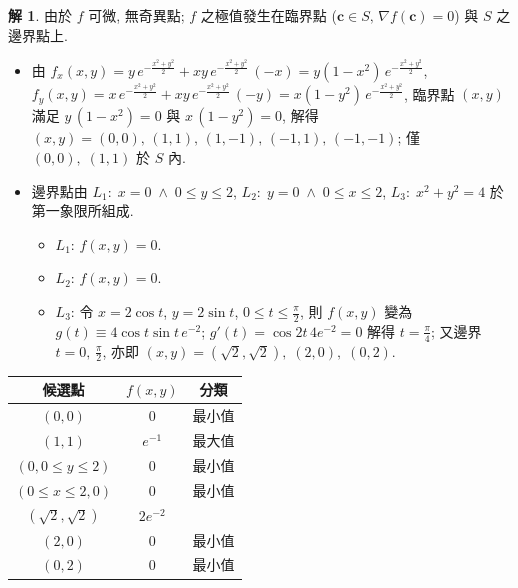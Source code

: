 \documentclass[12pt]{extarticle}
\newcommand{\ds}{\displaystyle}
\newcommand{\andd}{\;\wedge\;}
\theoremstyle{definition}
\newtheorem*{sol}{解}
\newcommand{\vc}{\mathbf{c}}
\begin{document}
\begin{sol}
  由於 $f$ 可微, 無奇異點; $f$ 之極值發生在臨界點 ($\vc\in S,\,\nabla f(\vc) = 0$) 與 $S$ 之邊界點上. 
  \begin{itemize}\setlength\itemsep{0em}
    \item 由 $\ds f_x(x, y) = y\,e^{-\frac{x^2 + y^2}{2}} + xy\,e^{-\frac{x^2 + y^2}{2}}\,(-x) = y(1 - x^2)\,e^{-\frac{x^2 + y^2}{2}}$, $\ds f_y(x, y) = x\,e^{-\frac{x^2 + y^2}{2}} + xy\,e^{-\frac{x^2 + y^2}{2}}\,(-y) = x(1 - y^2)\,e^{-\frac{x^2 + y^2}{2}}$, 臨界點 $(x, y)$ 滿足 $\ds y\,(1 - x^2) = 0$ 與 $x\,(1 - y^2) = 0$, 解得 $(x, y) = (0, 0),\,(1, 1),\,(1, -1),\,(-1, 1),\,(-1, -1)$; 僅 $(0, 0),\;(1, 1)$ 於 $S$ 內. 
    \item 邊界點由 $L_1:\;x = 0\andd 0\leqslant y\leqslant 2$, $L_2:\;y = 0\andd 0\leqslant x\leqslant 2$, $L_3:\;x^2 + y^2 = 4$ 於第一象限所組成. 
      \begin{itemize}\setlength\itemsep{0em}
        \item $L_1$: $f(x, y) = 0$. 
        \item $L_2$: $f(x, y) = 0$. 
        \item $L_3$: 令 $x = 2\cos t$, $y = 2\sin t$, $0\leqslant t\leqslant\frac{\pi}{2}$, 則 $f(x, y)$ 變為 $\ds g(t)\equiv4\cos t\sin t\,e^{-2}$; $g'(t) = \cos 2t\,4e^{-2} = 0$ 解得 $t = \frac{\pi}{4}$; 又邊界 $t = 0,\,\frac{\pi}{2}$, 亦即 $(x, y) = (\sqrt{2}, \sqrt{2}),\;(2, 0),\;(0, 2)$.  
      \end{itemize}
  \end{itemize}
  \begin{center}
    \renewcommand{\arraystretch}{1.3}
    \begin{tabular}{ccc}
      \toprule
      候選點  & $f(x,y)$ & 分類 \\ 
      \midrule
      $(0, 0)$ & $0$ & 最小值 \\ 
      $(1, 1)$ & $e^{-1}$ & 最大值 \\ 
      $(0, 0\leqslant y\leqslant 2)$ & $0$ & 最小值 \\
      $(0\leqslant x\leqslant 2, 0)$ & $0$ & 最小值 \\
      $(\sqrt{2}, \sqrt{2})$ & $2e^{-2}$ & \\ 
      $(2, 0)$ & $0$ & 最小值 \\ 
      $(0, 2)$ & $0$ & 最小值 \\ 
      \bottomrule
    \end{tabular}
    \renewcommand{\arraystretch}{1.0}
  \end{center}
\end{sol}
\end{document}

